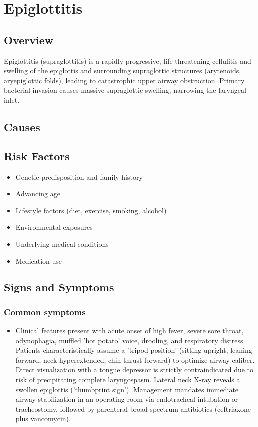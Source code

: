 \chapter{Epiglottitis}
\label{throat:Epiglottitis}

\section{Overview}
Epiglottitis (supraglottitis) is a rapidly progressive, life-threatening cellulitis and swelling of the epiglottis and surrounding supraglottic structures (arytenoids, aryepiglottic folds), leading to catastrophic upper airway obstruction. Primary bacterial invasion causes massive supraglottic swelling, narrowing the laryngeal inlet.
\section{Causes}
\section{Risk Factors}

\begin{itemize}[noitemsep]
  \item Genetic predisposition and family history
  \item Advancing age
  \item Lifestyle factors (diet, exercise, smoking, alcohol)
  \item Environmental exposures
  \item Underlying medical conditions
  \item Medication use
\end{itemize}
\section{Signs and Symptoms}

\subsection{Common symptoms}
\begin{itemize}[noitemsep]
  \item Clinical features present with acute onset of high fever, severe sore throat, odynophagia, muffled 'hot potato' voice, drooling, and respiratory distress. Patients characteristically assume a 'tripod position' (sitting upright, leaning forward, neck hyperextended, chin thrust forward) to optimize airway caliber. Direct visualization with a tongue depressor is strictly contraindicated due to risk of precipitating complete laryngospasm. Lateral neck X-ray reveals a swollen epiglottis ('thumbprint sign'). Management mandates immediate airway stabilization in an operating room via endotracheal intubation or tracheostomy, followed by parenteral broad-spectrum antibiotics (ceftriaxone plus vancomycin). 
  \end{itemize}

